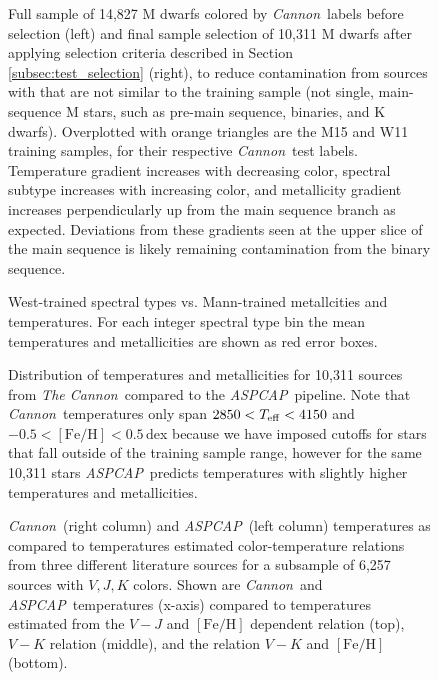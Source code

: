\documentclass[modern]{aastex62}
\newcommand{\thecannon}{\textsl{The Cannon}}
\newcommand{\cannon}{\textsl{Cannon}}
\newcommand{\aspcap}{\textsl{ASPCAP}}
\newcommand{\feh}{[{\mathrm{Fe}/\mathrm{H}}]}
\begin{document}
\begin{figure}[ht]
\caption{Full sample of 14,827 M dwarfs colored by \cannon\ labels before selection (left) and final sample selection of 10,311 M dwarfs after applying selection criteria described in Section \ref{subsec:test_selection} (right), to reduce contamination from sources with that are not similar to the training sample (not single, main-sequence M stars, such as pre-main sequence, binaries, and K dwarfs). Overplotted with orange triangles are the M15 and W11 training samples, for their respective \cannon\ test labels. Temperature gradient increases with decreasing color, spectral subtype increases with increasing color, and metallicity gradient increases perpendicularly up from the main sequence branch as expected. Deviations from these gradients seen at the upper slice of the main sequence is likely remaining contamination from the binary sequence. \label{fig:safe_selection}}
\end{figure}

\begin{figure}[ht]
\caption{West-trained spectral types vs. Mann-trained metallcities and temperatures. For each integer spectral type bin the mean temperatures and metallicities are shown as red error boxes. \label{fig:west_vs_mann}}
\end{figure}

\begin{figure}[ht]
\caption{Distribution of temperatures and metallicities for 10,311 sources from \thecannon\ compared to the \aspcap\ pipeline. Note that \cannon\ temperatures only span $2850<T_{\rm eff}<4150$ and $-0.5<\feh<0.5$\,dex because we have imposed cutoffs for stars that fall outside of the training sample range, however for the same 10,311 stars \aspcap\ predicts temperatures with slightly higher temperatures and metallicities. \label{fig:aspcap_cannon_label_hist}} 
\end{figure}

\begin{figure}[ht]
\caption{\cannon\ (right column) and \aspcap\ (left column) temperatures as compared to temperatures estimated color-temperature relations from three different literature sources for a subsample of 6,257 sources with $V,J,K$ colors. Shown are \cannon\ and \aspcap\ temperatures (x-axis) compared to temperatures estimated from the \citealt{Mann:2015} $V-J$ and $\feh$ dependent relation (top), \citealt{Casagrande:2008} $V-K$ relation (middle), and the \citealt{Boyajian:2012} relation $V-K$ and $\feh$ (bottom).  \label{fig:teff_comparisons}}
\end{figure}
\end{document}

